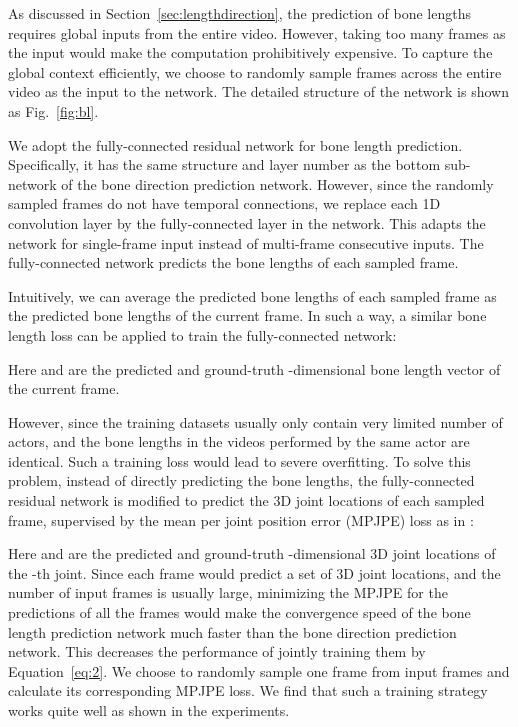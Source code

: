\documentclass[journal]{IEEEtran}
\begin{document}
As discussed in Section~\ref{sec:lengthdirection}, the prediction of bone lengths requires global inputs from the entire video. However, taking too many frames as the input would make the computation prohibitively expensive. To capture the global context efficiently, we choose to randomly sample  frames across the entire video as the input to the network. The detailed structure of the network is shown as Fig.~\ref{fig:bl}.

We adopt the fully-connected residual network for bone length prediction. Specifically, it has the same structure and layer number as the bottom sub-network of the bone direction prediction network. However, since the randomly sampled frames do not have temporal connections, we replace each 1D convolution layer by the fully-connected layer in the network. This adapts the network for single-frame input instead of multi-frame consecutive inputs. The fully-connected network predicts the  bone lengths of each sampled frame.

Intuitively, we can average the predicted bone lengths of each sampled frame as the predicted bone lengths of the current frame. In such a way, a similar bone length loss can be applied to train the fully-connected network:  
\vspace{-1mm}

Here  and  are the predicted and ground-truth -dimensional bone length vector of the current frame.

However, since the training datasets usually only contain very limited number of actors, and the bone lengths in the videos performed by the same actor are identical. Such a training loss would lead to severe overfitting. To solve this problem, instead of directly predicting the bone lengths, the fully-connected residual network is modified to predict the 3D joint locations of each sampled frame, supervised by the mean per joint position error (MPJPE) loss as in \cite{pavllo20193d}:
\vspace{-1mm} 

Here  and  are the predicted and ground-truth -dimensional 3D joint locations of the -th joint. Since each frame would predict a set of 3D joint locations, and the number of input frames  is usually large, minimizing the MPJPE for the predictions of all the frames would make the convergence speed of the bone length prediction network much faster than the bone direction prediction network. This decreases the performance of jointly training them by Equation~\ref{eq:2}.
We choose to randomly sample one frame from  input frames and calculate its corresponding MPJPE loss. We find that such a training strategy works quite well as shown in the experiments. 
\end{document}
